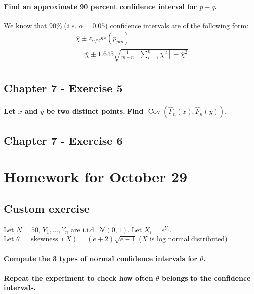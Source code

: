 \documentclass{article}
\newcommand{\ie}{\textit{i.e. }}
\begin{document}
\paragraph{Find an approximate 90 percent confidence interval for $p-q$.\\}
We know that 90\% (\ie \(\alpha = 0.05\)) confidence intervals are of the following form:
\begin{align*}
     & \overline{\chi} \pm z_{\alpha/2} se(p_{pin})                                                         \\
     & = \overline{\chi} \pm 1.645 \sqrt{\frac{1}{m+n}\left[\sum_{i=1}^n \chi^2\right] - \overline{\chi}^2} \\
\end{align*}

\subsection{Chapter 7 - Exercise 5}
\paragraph{Let $x$ and $y$ be two distinct points. Find $\operatorname{Cov}\left(\hat{F}_{n}(x), \hat{F}_{n}(y)\right)$.}
\subsection{Chapter 7 - Exercise 6}

\section{Homework for October 29}
\subsection{Custom exercise}
Let \(N=50\), \(Y_1, \ldots, Y_n\) are i.i.d. \(\mathcal{N}(0,1)\).
Let \(X_i = e^{Y_i}\).\\
Let \(\theta = \operatorname{skewness}(X) = (e+2)\sqrt{e-1}\) (\(X\) is log normal distributed) \\
\paragraph{Compute the 3 types of normal confidence intervals for \(\theta\).}
\paragraph{Repeat the experiment to check how often \(\theta\) belongs to the confidence intervals.}
\end{document}
